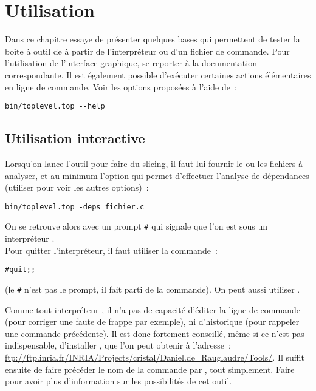 \chapter{Utilisation}\label{sec-man}

Dans ce chapitre essaye de présenter quelques bases qui permettent de tester
la boîte à outil de \slicing à partir de l'interpréteur ou
d'un fichier de commande.
Pour l'utilisation de l'interface graphique,
 se reporter à la documentation correspondante.
Il est également possible d'exécuter certaines actions élémentaires
en ligne de commande. Voir les options proposées à l'aide de~:
\begin{center}
\verb!bin/toplevel.top --help!
\end{center}

\section{Utilisation interactive}

Lorsqu'on lance l'outil pour faire du slicing, il faut lui fournir le ou les
fichiers à analyser, et au minimum l'option 
qui permet d'effectuer l'analyse de
dépendances (utiliser  pour voir les autres options)~:
\begin{center}
\verb!bin/toplevel.top -deps fichier.c!
\end{center}

On se retrouve alors avec un prompt \verb!#!
qui signale que l'on est sous un interpréteur \caml.\\

Pour quitter l'interpréteur, il faut utiliser la commande~:
\begin{center}
\verb!#quit;;!
\end{center}

(le \verb!#! n'est pas le prompt, il fait parti de la commande).
On peut aussi utiliser .

\begin{astuce}\label{astuce-ledit}
Comme tout interpréteur \caml, il n'a pas de capacité d'éditer la ligne de
commande (pour corriger une faute de frappe par exemple), ni d'historique (pour
rappeler une commande précédente). Il est donc fortement conseillé, même si ce
n'est pas indispensable, d'installer
, que l'on peut obtenir à l'adresse~: \\
\url{ftp://ftp.inria.fr/INRIA/Projects/cristal/Daniel.de\_Rauglaudre/Tools/}.
Il suffit ensuite de faire précéder le nom de la commande par , tout
simplement.
Faire  pour avoir plus d'information sur les possibilités de cet
outil.
\end{astuce}

